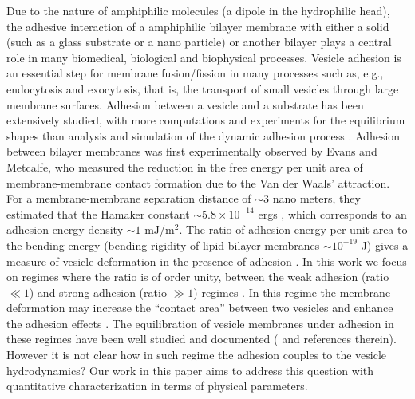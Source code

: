 \documentclass[%
preprint,
 amsmath,amssymb,
 aps,
]{revtex4-1}
\begin{document}
Due to the nature of amphiphilic molecules (a dipole in the hydrophilic head), the adhesive interaction of a amphiphilic bilayer membrane 
with either a solid (such as a glass substrate or a nano particle) or another bilayer 
plays a central role in many biomedical, biological and biophysical processes.
Vesicle adhesion is an essential step for membrane fusion/fission in many
processes such as, e.g., endocytosis and exocytosis, that is, the
transport of small vesicles through large membrane surfaces. 
Adhesion between a vesicle and a substrate has been extensively studied, with 
more computations and experiments for the equilibrium shapes \cite{Seifert1990_PRA,ShiFengGao2006_ActaMechSin,LinFreund2007_IntJSolidsStructures} than analysis and simulation of
the dynamic adhesion process \cite{BlountMiksisDavis2013_PRSa}.
Adhesion between bilayer membranes was first experimentally observed by Evans and Metcalfe, who measured 
the reduction in the free energy per unit area of membrane-membrane contact formation due to the Van der Waals' attraction. For a membrane-membrane
separation distance of $\sim 3$ nano meters, they estimated that the Hamaker constant $\sim 5.8\times 10^{-14}$ ergs \cite{EvansMetcalfe1984_BJ}, which corresponds to an adhesion energy density $\sim 1$ mJ/m$^2$. The ratio of adhesion energy per unit area to the bending energy (bending rigidity of lipid bilayer membranes $\sim 10^{-19}$ J) gives a measure of vesicle deformation in the presence of adhesion \cite{RamachandranAndersonLealIsraelachvili2010_Langmuir}. In this work we focus on regimes where the ratio is of order unity, between the weak adhesion (ratio $\ll 1$) and strong adhesion (ratio $\gg 1$) regimes \cite{RamachandranAndersonLealIsraelachvili2010_Langmuir}. 
In this regime the membrane deformation may increase the ``contact area'' between two vesicles and enhance the adhesion effects \cite{RamachandranAndersonLealIsraelachvili2010_Langmuir}. The equilibration of vesicle membranes under adhesion in these regimes have been well studied and documented (\cite{RamachandranAndersonLealIsraelachvili2010_Langmuir} and references therein). However it is not clear how in such regime the adhesion couples to the vesicle hydrodynamics? Our work in this paper aims to address this question with quantitative characterization in terms of physical parameters.
\end{document}
